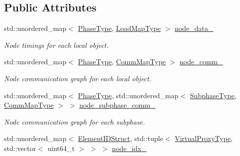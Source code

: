 \subsection*{Public Attributes}
\begin{DoxyCompactItemize}
\item 
std\+::unordered\+\_\+map$<$ \hyperlink{namespacevt_a46ce6733d5cdbd735d561b7b4029f6d7}{Phase\+Type}, \hyperlink{namespacevt_1_1vrt_1_1collection_1_1balance_a5339303db2e1ce964d783a53fd74e6b1}{Load\+Map\+Type} $>$ \hyperlink{structvt_1_1vrt_1_1collection_1_1balance_1_1_stats_data_a34a782537ef1b33bfc1c7b1f635e1c72}{node\+\_\+data\+\_\+}
\begin{DoxyCompactList}\small\item\em Node timings for each local object. \end{DoxyCompactList}\item 
std\+::unordered\+\_\+map$<$ \hyperlink{namespacevt_a46ce6733d5cdbd735d561b7b4029f6d7}{Phase\+Type}, \hyperlink{namespacevt_1_1vrt_1_1collection_1_1balance_a01ee1fb0ae2da1d2ab7fdca3be9ae351}{Comm\+Map\+Type} $>$ \hyperlink{structvt_1_1vrt_1_1collection_1_1balance_1_1_stats_data_a5ee2aea35e48a4855c8f99c16b588287}{node\+\_\+comm\+\_\+}
\begin{DoxyCompactList}\small\item\em Node communication graph for each local object. \end{DoxyCompactList}\item 
std\+::unordered\+\_\+map$<$ \hyperlink{namespacevt_a46ce6733d5cdbd735d561b7b4029f6d7}{Phase\+Type}, std\+::unordered\+\_\+map$<$ \hyperlink{namespacevt_ae78cbfdf1e57470e33eedb074f2beeba}{Subphase\+Type}, \hyperlink{namespacevt_1_1vrt_1_1collection_1_1balance_a01ee1fb0ae2da1d2ab7fdca3be9ae351}{Comm\+Map\+Type} $>$ $>$ \hyperlink{structvt_1_1vrt_1_1collection_1_1balance_1_1_stats_data_ac78802ff554a4d802a163afa5756412e}{node\+\_\+subphase\+\_\+comm\+\_\+}
\begin{DoxyCompactList}\small\item\em Node communication graph for each subphase. \end{DoxyCompactList}\item 
std\+::unordered\+\_\+map$<$ \hyperlink{namespacevt_1_1vrt_1_1collection_1_1balance_a9f5b53fafb270212279a4757d2c4cd28}{Element\+I\+D\+Struct}, std\+::tuple$<$ \hyperlink{namespacevt_a1b417dd5d684f045bb58a0ede70045ac}{Virtual\+Proxy\+Type}, std\+::vector$<$ uint64\+\_\+t $>$ $>$ $>$ \hyperlink{structvt_1_1vrt_1_1collection_1_1balance_1_1_stats_data_a28e705281f97d1afd659848de7af7d7b}{node\+\_\+idx\+\_\+}

\end{DoxyCompactItemize}
